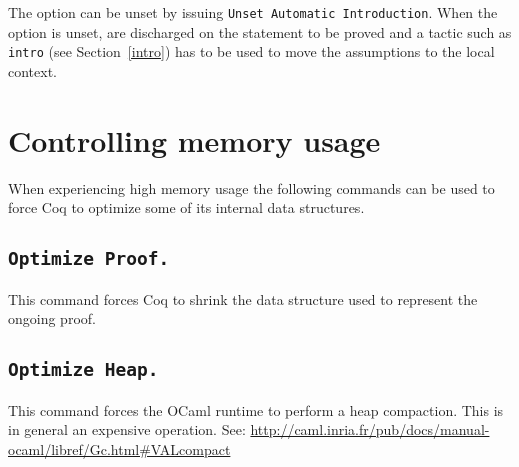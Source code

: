 The option can be unset by issuing {\tt Unset Automatic Introduction}.
When the option is unset, {\binders} are discharged on the statement
to be proved and a tactic such as {\tt intro} (see
Section~\ref{intro}) has to be used to move the assumptions to the
local context.

\section{Controlling memory usage}

When experiencing high memory usage the following commands can be
used to force Coq to optimize some of its internal data structures.

\subsection[\tt Optimize Proof.]{\tt Optimize Proof.}

This command forces Coq to shrink the data structure used to represent
the ongoing proof.

\subsection[\tt Optimize Heap.]{\tt Optimize Heap.}

This command forces the OCaml runtime to perform a heap compaction.
This is in general an expensive operation.  See:
  \url{http://caml.inria.fr/pub/docs/manual-ocaml/libref/Gc.html#VALcompact}


